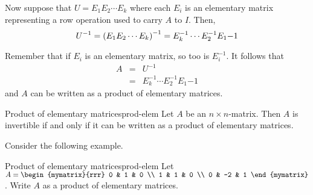 Now suppose that $U = E_1 E_2 \cdots E_k$ where each $E_i$ is an elementary matrix representing a row operation used to carry $A$ to $I$. Then, 
\[
U^{-1} = \left(E_1 E_2 \cdots E_k \right) ^{-1}  =  E_k^{-1} \cdots E_2^{-1} E_1{-1} 
\]

Remember that if $E_i$ is an elementary matrix, so too is $E_i^{-1}$. 
It follows that 
\begin{eqnarray*}
A&=& U^{-1} \\
&=&  E_k^{-1} \cdots E_2^{-1} E_1{-1}
\end{eqnarray*}
and $A$ can be written as a product of elementary matrices. 

\begin{theorem}{Product of elementary matrices}{prod-elem}
Let $A$ be an $n \times n$-matrix. Then $A$ is invertible if and only if it can be written as a product of elementary matrices.
\end{theorem}

Consider the following example.

\begin{example}{Product of elementary matrices}{prod-elem}
Let $A = \begin{mymatrix}{rrr}
0 & 1 & 0 \\
1 & 1 & 0 \\
0 & -2 & 1 
\end{mymatrix}$. 
Write $A$ as a product of elementary matrices. 
\end{example}

